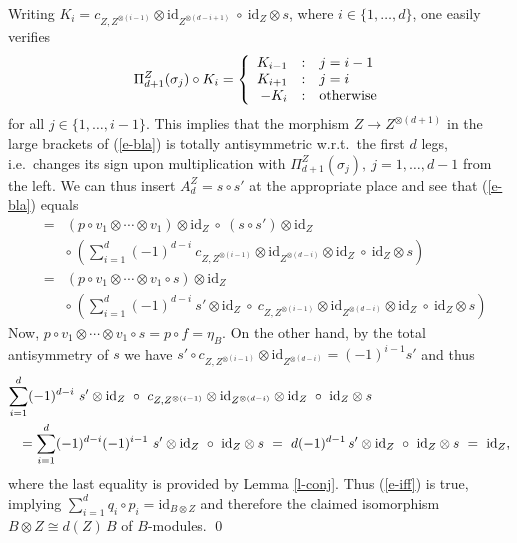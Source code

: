 \documentclass[12pt]{article}
\theoremstyle{definition}
\theoremstyle{definition}
\theoremstyle{remark}
\newcommand{\mcirc}{\circ}
\newcommand{\rarr}{\rightarrow}
\def\id{\mathrm{id}}
\begin{document}
Writing $K_i=c_{Z,Z^{\otimes(i-1)}}\otimes\id_{Z^{\otimes(d-i+1)}}\ \circ\ \id_Z\otimes s$, where
$i\in\{1,\ldots,d\}$, one easily verifies
\[ \Pi^Z_{d+1}(\sigma_j)\mcirc K_i= \left\{ 
\begin{array} {r@{\quad:\quad}l}
  K_{i-1} & j=i-1 \\ K_{i+1} & j=i \\ -K_i & \mbox{otherwise}
\end{array}\right. \]
for all $j\in\{1,\ldots,i-1\}$. This implies that the morphism $Z\rarr Z^{\otimes (d+1)}$ in the
large brackets of (\ref{e-bla}) is totally antisymmetric w.r.t.\ the first $d$ legs, i.e.\ changes
its sign upon multiplication with $\Pi_{d+1}^Z(\sigma_j),\ j=1,\ldots,d-1$ from the left. 
We can thus insert $A_d^Z=s\circ s'$ at the appropriate place and see that (\ref{e-bla}) equals
\begin{eqnarray*} &=& (p \mcirc v_1\otimes \cdots\otimes v_1) \otimes\id_Z \ \circ\ 
  (s\circ s')\otimes\id_Z \\
&& \circ\ \left(\sum_{i=1}^d (-1)^{d-i}\ c_{Z,Z^{\otimes(i-1)}}\otimes
     \id_{Z^{\otimes(d-i)}} \otimes\id_Z\ \circ\ \id_Z\otimes s \right) \\
 &=& (p\mcirc v_1\otimes \cdots\otimes v_1\mcirc
 s)\otimes\id_Z \\
&& \circ\ \left(\sum_{i=1}^d (-1)^{d-i}\
   s'\otimes\id_Z\ \circ\ c_{Z,Z^{\otimes(i-1)}}\otimes\id_{Z^{\otimes(d-i)}} \otimes\id_Z\ \circ\
  \id_Z\otimes s \right) 
\end{eqnarray*}
Now, $p\mcirc v_1\otimes \cdots\otimes v_1\mcirc s=p\mcirc f=\eta_B$.
On the other hand, by the total antisymmetry of $s$ we have 
$s'\mcirc c_{Z,Z^{\otimes(i-1)}}\otimes\id_{Z^{\otimes(d-i)}}=(-1)^{i-1}s'$ and thus
\begin{eqnarray*} \lefteqn{ \sum_{i=1}^d (-1)^{d-i}\ s'\otimes\id_Z\ \circ\
   c_{Z,Z^{\otimes(i-1)}}\otimes\id_{Z^{\otimes(d-i)}} \otimes\id_Z\ \circ\ \id_Z\otimes s } \\
   && = \sum_{i=1}^d (-1)^{d-i}(-1)^{i-1}\ s'\otimes\id_Z\ \circ\ \id_Z\otimes s
   \ =\ d(-1)^{d-1}\,s'\otimes\id_Z\ \circ\ \id_Z\otimes s\ =\ \id_Z, 
\end{eqnarray*}
where the last equality is provided by Lemma \ref{l-conj}. Thus (\ref{e-iff}) is true, implying
$\sum_{i=1}^d q_i\circ p_i=\id_{B\otimes Z}$ and therefore the claimed isomorphism
$B\otimes Z\cong d(Z)\,B$ of $B$-modules.
\qed
\end{document}
